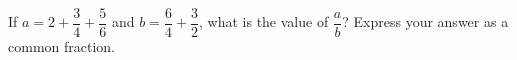 If $a=2+\dfrac{3}{4}+\dfrac{5}{6}$ and $b=\dfrac{6}{4}+\dfrac{3}{2}$, what is the value of $\dfrac {a}{b}$? Express your answer as a common fraction.
